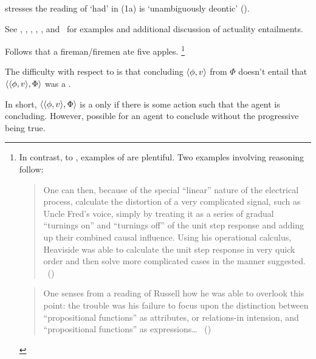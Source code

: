 \begin{note}
{    \citeauthor{Alxatib:2019wf} stresses the reading of `had' in (1a) is `unambiguously deontic' (\citeyear[703]{Alxatib:2019wf}).

    See \textcite{Asher:2012vr}, \textcite{Bhatt:2008aa}, \textcite{Hacquard:2006to,Hacquard:2009ta}, \textcite{Palmer:1977wb}, \textcite{Pinon:2003te}, and~\textcite{Werner:2011tp} for examples and additional discussion of actuality entailments.
  }
  Follows that a fireman/firemen ate five apples.%
  \footnote{
    In contrast, to \BoyPS{}, examples of \BoyPSC{} are plentiful.
    Two examples involving reasoning follow:

    \begin{quote}
      One can then, because of the special ``linear'' nature of the electrical process, calculate the distortion of a very complicated signal, such as Uncle Fred's voice, simply by treating it as a series of gradual ``turnings on'' and ``turnings off'' of the unit step response and adding up their combined causal influence.
      Using his operational calculus, Heaviside was able to calculate the unit step response in very quick order and then solve more complicated cases in the manner suggested.%
      \mbox{ }\hfill\mbox{(\cite[316]{Wilson:1988wx})}
    \end{quote}

     \begin{quote}
       One senses from a reading of Russell how he was able to overlook this point:
       the trouble was his failure to focus upon the distinction between ``propositional functions'' as attributes, or relations-in intension, and ``propositional functions'' as expressions\dots%
      \mbox{ }\hfill\mbox{(\cite[152]{Quine:1967tv})}
    \end{quote}

  }



  The difficulty with respect to  is that concluding \(\langle \phi, v \rangle\) from \(\Phi\) doesn't entail that \(\langle \langle \phi, v \rangle, \Phi \rangle\) was a \fc{}.

  In short, \(\langle \langle \phi, v \rangle, \Phi \rangle\) is a \fc{} only if there is some action such that the agent is concluding.
  However, possible for an agent to conclude without the progressive being true.


\end{note}

